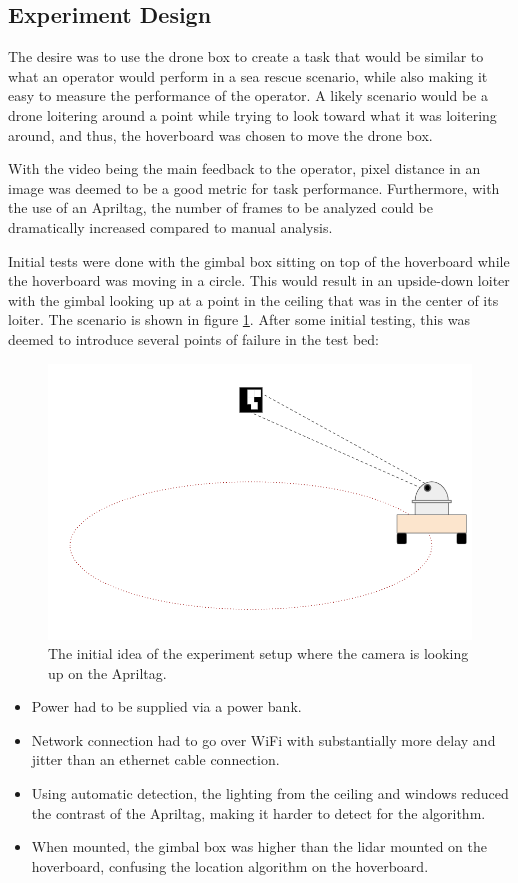 \documentclass[nofilelist]{cslthse-msc}
\begin{document}
\subsection{Experiment Design}
The desire was to use the drone box to create a task that would be similar to what an operator would perform in a sea rescue scenario, while also making it easy to measure the performance of the operator. A likely scenario would be a drone loitering around a point while trying to look toward what it was loitering around, and thus, the hoverboard was chosen to move the drone box. 

With the video being the main feedback to the operator, pixel distance in an image was deemed to be a good metric for task performance. Furthermore, with the use of an Apriltag, the number of frames to be analyzed could be dramatically increased compared to manual analysis.

Initial tests were done with the gimbal box sitting on top of the hoverboard while the hoverboard was moving in a circle. This would result in an upside-down loiter with the gimbal looking up at a point in the ceiling that was in the center of its loiter. The scenario is shown in figure \ref{fig:testbed-idea-1}. After some initial testing, this was deemed to introduce several points of failure in the test bed:

\begin{figure}[htp]
   \centering
   \includegraphics[width=.6\textwidth]{images/testbed1.png}
   \caption{The initial idea of the experiment setup where the camera is looking up on the Apriltag. }
   \label{fig:testbed-idea-1}
\end{figure}

\begin{itemize}
   \item Power had to be supplied via a power bank.
   \item Network connection had to go over WiFi with substantially more delay and jitter than an ethernet cable connection. 
   \item Using automatic detection, the lighting from the ceiling and windows reduced the contrast of the Apriltag, making it harder to detect for the algorithm.
   \item When mounted, the gimbal box was higher than the lidar mounted on the hoverboard, confusing the location algorithm on the hoverboard.
\end{itemize}
\end{document}
